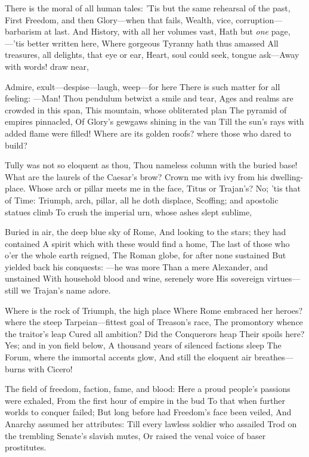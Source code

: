 \documentclass[10pt,twocolumn]{book}
\begin{document}
   There is the moral of all human tales:
   'Tis but the same rehearsal of the past,
   First Freedom, and then Glory---when that fails,
   Wealth, vice, corruption---barbarism at last.
   And History, with all her volumes vast,
   Hath but \textit{one} page,---'tis better written here,
   Where gorgeous Tyranny hath thus amassed
   All treasures, all delights, that eye or ear,
Heart, soul could seek, tongue ask---Away with words! draw near,


   Admire, exult---despise---laugh, weep---for here
   There is such matter for all feeling: ---Man!
   Thou pendulum betwixt a smile and tear,
   Ages and realms are crowded in this span,
   This mountain, whose obliterated plan
   The pyramid of empires pinnacled,
   Of Glory's gewgaws shining in the van
   Till the sun's rays with added flame were filled!
Where are its golden roofs? where those who dared to build?


   Tully was not so eloquent as thou,
   Thou nameless column with the buried base!
   What are the laurels of the Caesar's brow?
   Crown me with ivy from his dwelling-place.
   Whose arch or pillar meets me in the face,
   Titus or Trajan's?  No; 'tis that of Time:
   Triumph, arch, pillar, all he doth displace,
   Scoffing; and apostolic statues climb
To crush the imperial urn, whose ashes slept sublime,


   Buried in air, the deep blue sky of Rome,
   And looking to the stars; they had contained
   A spirit which with these would find a home,
   The last of those who o'er the whole earth reigned,
   The Roman globe, for after none sustained
   But yielded back his conquests: ---he was more
   Than a mere Alexander, and unstained
   With household blood and wine, serenely wore
His sovereign virtues---still we Trajan's name adore.


   Where is the rock of Triumph, the high place
   Where Rome embraced her heroes? where the steep
   Tarpeian---fittest goal of Treason's race,
   The promontory whence the traitor's leap
   Cured all ambition?  Did the Conquerors heap
   Their spoils here?  Yes; and in yon field below,
   A thousand years of silenced factions sleep\textemdash
   The Forum, where the immortal accents glow,
And still the eloquent air breathes---burns with Cicero!


   The field of freedom, faction, fame, and blood:
   Here a proud people's passions were exhaled,
   From the first hour of empire in the bud
   To that when further worlds to conquer failed;
   But long before had Freedom's face been veiled,
   And Anarchy assumed her attributes:
   Till every lawless soldier who assailed
   Trod on the trembling Senate's slavish mutes,
Or raised the venal voice of baser prostitutes.
\end{document}
